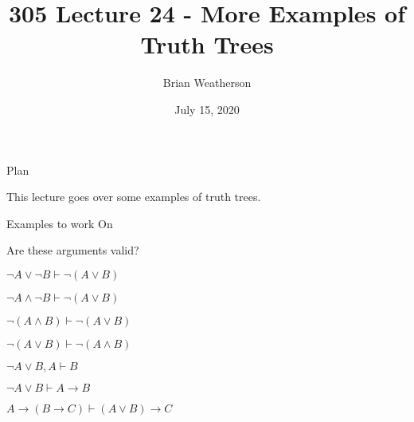 \documentclass[
  ignorenonframetext,
]{beamer}
\title{305 Lecture 24 - More Examples of Truth Trees}
\author{Brian Weatherson}
\date{July 15, 2020}
\renewcommand{\,}{\text{, }}
\begin{document}
\frame{\titlepage}

\begin{frame}{Plan}
\protect\hypertarget{plan}{}

This lecture goes over some examples of truth trees.

\end{frame}

\begin{frame}{Examples to work On}
\protect\hypertarget{examples-to-work-on}{}

Are these arguments valid?

\end{frame}

\begin{frame}{\(\neg A \vee \neg B \vdash \neg (A \vee B)\)}
\protect\hypertarget{neg-a-vee-neg-b-vdash-neg-a-vee-b}{}

\end{frame}

\begin{frame}{\(\neg A \wedge \neg B \vdash \neg (A \vee B)\)}
\protect\hypertarget{neg-a-wedge-neg-b-vdash-neg-a-vee-b}{}

\end{frame}

\begin{frame}{\(\neg (A \wedge B) \vdash \neg (A \vee B)\)}
\protect\hypertarget{neg-a-wedge-b-vdash-neg-a-vee-b}{}

\end{frame}

\begin{frame}{\(\neg (A \vee B) \vdash \neg (A \wedge B)\)}
\protect\hypertarget{neg-a-vee-b-vdash-neg-a-wedge-b}{}

\end{frame}

\begin{frame}{\(\neg A \vee B, A \vdash B\)}
\protect\hypertarget{neg-a-vee-b-a-vdash-b}{}

\end{frame}

\begin{frame}{\(\neg A \vee B \vdash A \rightarrow B\)}
\protect\hypertarget{neg-a-vee-b-vdash-a-rightarrow-b}{}

\end{frame}

\begin{frame}{\(A \rightarrow (B \rightarrow C) \vdash (A \vee B) \rightarrow C\)}
\protect\hypertarget{a-rightarrow-b-rightarrow-c-vdash-a-vee-b-rightarrow-c}{}

\end{frame}
\end{document}
